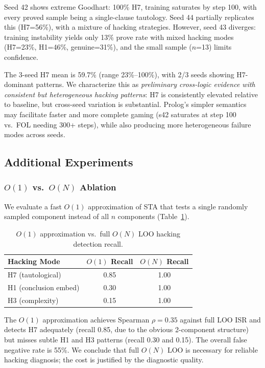 \documentclass[11pt,a4paper]{article}
\newcommand{\isr}{\textsc{ISR}}
\newcommand{\sta}{\textsc{STA}}
\begin{document}
Seed 42 shows extreme Goodhart: 100\% H7, training saturates by step 100, with every proved sample being a single-clause tautology.
Seed 44 partially replicates this (H7=56\%), with a mixture of hacking strategies.
However, seed 43 diverges: training instability yields only 13\% prove rate with mixed hacking modes (H7=23\%, H1=46\%, genuine=31\%), and the small sample ($n$=13) limits confidence.

The 3-seed H7 mean is 59.7\% (range 23\%--100\%), with 2/3 seeds showing H7-dominant patterns.
We characterize this as \emph{preliminary cross-logic evidence with consistent but heterogeneous hacking patterns}: H7 is consistently elevated relative to baseline, but cross-seed variation is substantial.
Prolog's simpler semantics may facilitate faster and more complete gaming (s42 saturates at step 100 vs.\ FOL needing 300+ steps), while also producing more heterogeneous failure modes across seeds.


\subsection{Additional Experiments}
\label{sec:additional}

\subsubsection{$O(1)$ vs.\ $O(N)$ Ablation}
\label{sec:o1_ablation}

We evaluate a fast $O(1)$ approximation of \sta{} that tests a single randomly sampled component instead of all $n$ components (Table~\ref{tab:o1_vs_on}).

\begin{table}[h]
\centering
\caption{$O(1)$ approximation vs.\ full $O(N)$ LOO hacking detection recall.}
\label{tab:o1_vs_on}
\begin{tabular}{lcc}
\toprule
Hacking Mode & $O(1)$ Recall & $O(N)$ Recall \\
\midrule
H7 (tautological) & 0.85 & 1.00 \\
H1 (conclusion embed) & 0.30 & 1.00 \\
H3 (complexity) & 0.15 & 1.00 \\
\bottomrule
\end{tabular}
\end{table}

The $O(1)$ approximation achieves Spearman $\rho{=}0.35$ against full LOO \isr{} and detects H7 adequately (recall 0.85, due to the obvious 2-component structure) but misses subtle H1 and H3 patterns (recall 0.30 and 0.15).
The overall false negative rate is 55\%.
We conclude that full $O(N)$ LOO is necessary for reliable hacking diagnosis; the cost is justified by the diagnostic quality.
\end{document}

